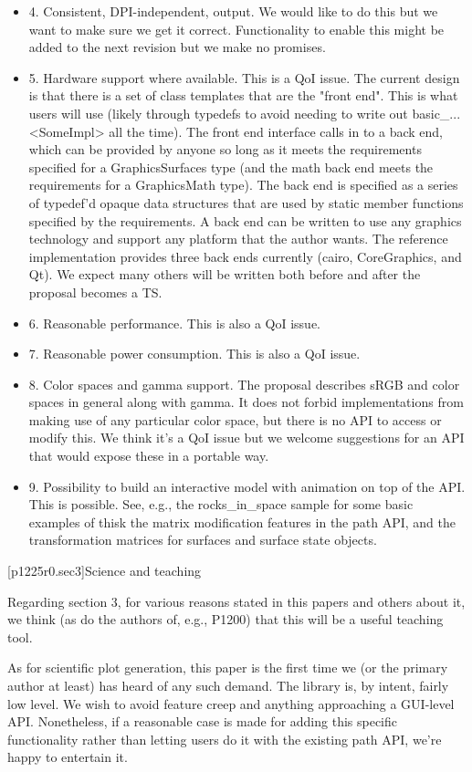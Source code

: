 \begin{itemize}
\item 4. Consistent, DPI-independent, output. We would like to do this but we want to make sure we get it correct. Functionality to enable this might be added to the next revision but we make no promises.
\item 5. Hardware support where available. This is a QoI issue. The current design is that there is a set of class templates that are the "front end". This is what users will use (likely through typedefs to avoid needing to write out basic_...<SomeImpl> all the time). The front end interface calls in to a back end, which can be provided by anyone so long as it meets the requirements specified for a GraphicsSurfaces type (and the math back end meets the requirements for a GraphicsMath type). The back end is specified as a series of typedef'd opaque data structures that are used by static member functions specified by the requirements. A back end can be written to use any graphics technology and support any platform that the author wants. The reference implementation provides three back ends currently (cairo, CoreGraphics, and Qt). We expect many others will be written both before and after the proposal becomes a TS.
\item 6. Reasonable performance. This is also a QoI issue.
\item 7. Reasonable power consumption. This is also a QoI issue.
\item 8. Color spaces and gamma support. The proposal describes sRGB and color spaces in general along with gamma. It does not forbid implementations from making use of any particular color space, but there is no API to access or modify this. We think it's a QoI issue but we welcome suggestions for an API that would expose these in a portable way.
\item 9. Possibility to build an interactive model with animation on top of the API. This is possible. See, e.g., the rocks_in_space sample for some basic examples of thisk the matrix modification features in the path API, and the transformation matrices for surfaces and surface state objects.
\end{itemize}

[p1225r0.sec3]{Science and teaching}

\pnum
Regarding section 3, for various reasons stated in this papers and others about it, we think (as do the authors of, e.g., P1200) that this will be a useful teaching tool.

\pnum
As for scientific plot generation, this paper is the first time we (or the primary author at least) has heard of any such demand. The library is, by intent, fairly low level. We wish to avoid feature creep and anything approaching a GUI-level API. Nonetheless, if a reasonable case is made for adding this specific functionality rather than letting users do it with the existing path API, we're happy to entertain it.

